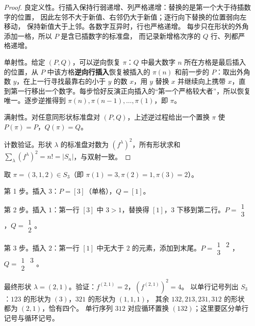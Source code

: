 \begin{proof}
良定义性。行插入保持行弱递增、列严格递增：替换的是第一个大于待插数字的位置，
因此左邻不大于新值、右邻仍大于新值；逐行向下替换的位置弱向左移动，
保持新值大于上邻。各数字互异时，行也严格递增。
每步只在形状的外角添加一格，所以 $P$ 是含已插数字的标准盘，
而记录新增格次序的 $Q$ 行、列都严格递增。

单射性。给定 $(P,Q)$，可以逆向恢复 $\pi$：$Q$ 中最大数字 $n$ 所在方格是最后插入的位置，从 $P$ 中该方格\textbf{逆向行插入}恢复被插入的 $\pi(n)$ 和前一步的 $P$：取出外角数 $y$，在上一行寻找最靠右的小于 $y$ 的数 $x$，用 $y$ 替换 $x$ 并继续向上携带 $x$，直到第一行移出一个数字。每步恰好反演正向插入的“第一个严格较大者”，所以恢复唯一。逐步逆推得到 $\pi(n),\pi(n-1),\dots,\pi(1)$，即 $\pi$。

满射性。对任意同形状标准盘对 $(P,Q)$，上述逆过程给出一个置换 $\pi$ 使 $P(\pi)=P$，$Q(\pi)=Q$。

计数验证。形状 $\lambda$ 的标准盘对数为 $(f^\lambda)^2$，所有形状求和 $\sum_\lambda(f^\lambda)^2=n!=|S_n|$，与双射一致。
\end{proof}

\begin{example}
取 $\pi=(3,1,2)\in S_3$（即 $\pi(1)=3,\pi(2)=1,\pi(3)=2$）。

第 1 步。插入 $3$：$P=[3]$（单格），$Q=[1]$。

第 2 步。插入 $1$：第一行 $[3]$ 中 $3>1$，替换得 $[1]$，$3$ 下移到第二行。$P=\begin{smallmatrix}1\\3\end{smallmatrix}$，$Q=\begin{smallmatrix}1\\2\end{smallmatrix}$。

第 3 步。插入 $2$：第一行 $[1]$ 中无大于 $2$ 的元素，添加到末尾。$P=\begin{smallmatrix}1&2\\3&\end{smallmatrix}$，$Q=\begin{smallmatrix}1&3\\2&\end{smallmatrix}$。

最终形状 $\lambda=(2,1)$。验证：$f^{(2,1)}=2$，$(f^{(2,1)})^2=4$。
以单行记号列出 $S_3$：$123$ 的形状为 $(3)$，$321$ 的形状为 $(1,1,1)$，
其余 $132,213,231,312$ 的形状都为 $(2,1)$，恰有四个。
单行序列 $312$ 对应循环置换 $(132)$；这里要区分单行记号与循环记号。
\end{example}


